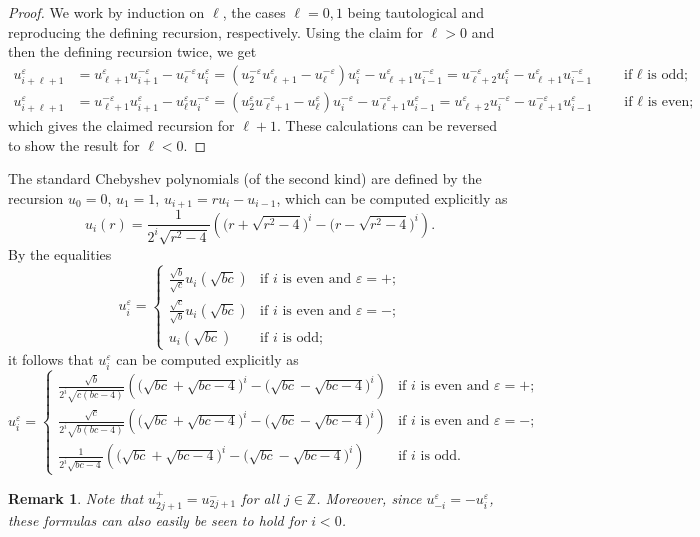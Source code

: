 \documentclass{amsart}
\newtheorem{remark}[theorem]{Remark}
\numberwithin{theorem}{section}
\newcommand{\ZZ}{\mathbb{Z}}
\begin{document}
  \begin{proof}
    We work by induction on $\ell$, the cases $\ell=0,1$ being tautological and reproducing the defining recursion, respectively.
    Using the claim for $\ell>0$ and then the defining recursion twice, we get
    \begin{align*}
      u_{i+\ell+1}^\varepsilon
      &=
      u_{\ell+1}^\varepsilon u_{i+1}^{-\varepsilon}-u_\ell^{-\varepsilon} u_i^\varepsilon
      =(u_2^{-\varepsilon} u_{\ell+1}^\varepsilon-u_\ell^{-\varepsilon}) u_i^\varepsilon-u_{\ell+1}^\varepsilon u_{i-1}^{-\varepsilon}
      =u_{\ell+2}^{-\varepsilon} u_i^\varepsilon - u_{\ell+1}^\varepsilon u_{i-1}^{-\varepsilon}
      \qquad \text{if $\ell$ is odd;}\\ 
      u_{i+\ell+1}^\varepsilon
      &=
      u_{\ell+1}^{-\varepsilon} u_{i+1}^\varepsilon-u_\ell^\varepsilon u_i^{-\varepsilon}
      =(u_2^\varepsilon u_{\ell+1}^{-\varepsilon}-u_\ell^\varepsilon) u_i^{-\varepsilon}-u_{\ell+1}^{-\varepsilon} u_{i-1}^\varepsilon
      =u_{\ell+2}^\varepsilon u_i^{-\varepsilon}-u_{\ell+1}^{-\varepsilon} u_{i-1}^\varepsilon
      \qquad \text{if $\ell$ is even;} 
    \end{align*}
    which gives the claimed recursion for $\ell+1$.
    These calculations can be reversed to show the result for $\ell<0$.
  \end{proof}

  The standard Chebyshev polynomials (of the second kind) are defined by the recursion $u_0=0$, $u_1=1$, $u_{i+1}=ru_i-u_{i-1}$, which can be computed explicitly as
  \[u_i(r)=\frac{1}{2^i\sqrt{r^2-4}}\left(\big(r+\sqrt{r^2-4}\big)^i-\big(r-\sqrt{r^2-4}\big)^i\right).\]
  By the equalities 
  \[u_i^\varepsilon=\begin{cases} \frac{\sqrt{b}}{\sqrt{c}}u_i(\sqrt{bc}) & \text{if $i$ is even and $\varepsilon=+$;}\\ \frac{\sqrt{c}}{\sqrt{b}}u_i(\sqrt{bc}) & \text{if $i$ is even and $\varepsilon=-$;}\\ u_i(\sqrt{bc}) & \text{if $i$ is odd;} \end{cases}\]
  it follows that $u_i^\varepsilon$ can be computed explicitly as
  \[u_i^\varepsilon=\begin{cases} \frac{\sqrt{b}}{2^i\sqrt{c(bc-4)}}\left(\big(\sqrt{bc}+\sqrt{bc-4}\big)^i-\big(\sqrt{bc}-\sqrt{bc-4}\big)^i\right) & \text{if $i$ is even and $\varepsilon=+$;}\\ \frac{\sqrt{c}}{2^i\sqrt{b(bc-4)}}\left(\big(\sqrt{bc}+\sqrt{bc-4}\big)^i-\big(\sqrt{bc}-\sqrt{bc-4}\big)^i\right) & \text{if $i$ is even and $\varepsilon=-$;}\\ \frac{1}{2^i\sqrt{bc-4}}\left(\big(\sqrt{bc}+\sqrt{bc-4}\big)^i-\big(\sqrt{bc}-\sqrt{bc-4}\big)^i\right) & \text{if $i$ is odd.} \end{cases}\]
  \begin{remark}
    Note that $u_{2j+1}^+=u_{2j+1}^-$ for all $j\in\ZZ$.
    Moreover, since $u_{-i}^\varepsilon=-u_i^\varepsilon$, these formulas can also easily be seen to hold for $i<0$.
  \end{remark}
\end{document}
